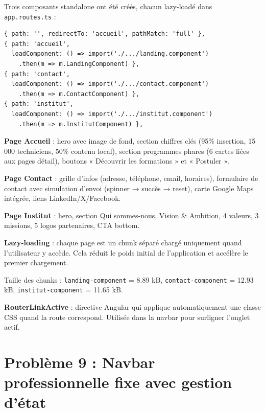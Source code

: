 \documentclass[a4paper,12pt,french]{article}
\begin{document}
\begin{solutionbox}
Trois composants standalone ont été créés, chacun lazy-loadé dans \texttt{app.routes.ts} :

\begin{lstlisting}[style=tsstyle]
{ path: '', redirectTo: 'accueil', pathMatch: 'full' },
{ path: 'accueil',
  loadComponent: () => import('./.../landing.component')
    .then(m => m.LandingComponent) },
{ path: 'contact',
  loadComponent: () => import('./.../contact.component')
    .then(m => m.ContactComponent) },
{ path: 'institut',
  loadComponent: () => import('./.../institut.component')
    .then(m => m.InstitutComponent) },
\end{lstlisting}

\textbf{Page Accueil} : hero avec image de fond, section chiffres clés (95\% insertion, 15 000 techniciens, 50\% contenu local), section programmes phares (6 cartes liées aux pages détail), boutons « Découvrir les formations » et « Postuler ».

\textbf{Page Contact} : grille d'infos (adresse, téléphone, email, horaires), formulaire de contact avec simulation d'envoi (spinner → succès → reset), carte Google Maps intégrée, liens LinkedIn/X/Facebook.

\textbf{Page Institut} : hero, section Qui sommes-nous, Vision \& Ambition, 4 valeurs, 3 missions, 5 logos partenaires, CTA bottom.
\end{solutionbox}

\begin{lessonbox}
\textbf{Lazy-loading} : chaque page est un chunk séparé chargé uniquement quand l'utilisateur y accède. Cela réduit le poids initial de l'application et accélère le premier chargement.

Taille des chunks : \texttt{landing-component} = 8.89 kB, \texttt{contact-component} = 12.93 kB, \texttt{institut-component} = 11.65 kB.

\textbf{RouterLinkActive} : directive Angular qui applique automatiquement une classe CSS quand la route correspond. Utilisée dans la navbar pour surligner l'onglet actif.
\end{lessonbox}

\newpage

\section{Problème 9 : Navbar professionnelle fixe avec gestion d'état}
\end{document}
